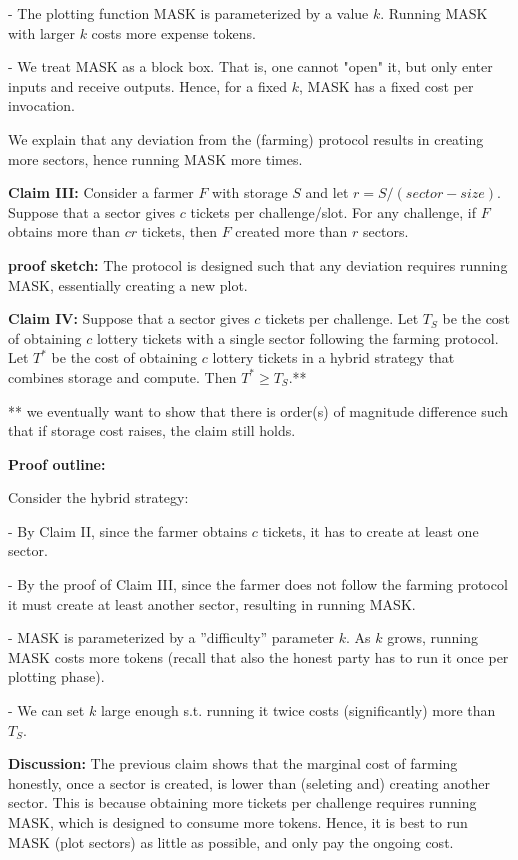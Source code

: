 \documentclass[12pt, onecolumn]{IEEEtran}
\begin{document}
- The plotting function MASK is parameterized by a value $k$. Running MASK with larger $k$ costs more expense tokens.

- We treat MASK as a block box. That is, one cannot "open" it, but only enter inputs and receive outputs. Hence, for a fixed $k$, MASK has a fixed cost per invocation.



We explain that any deviation from the (farming) protocol results in creating more sectors, hence running MASK more times.

{\bf Claim III:} Consider a farmer $F$ with storage $S$ and let $r = S/(sector-size)$. Suppose that a sector gives $c$ tickets per challenge/slot. For any challenge, if $F$ obtains more than $cr$ tickets, then $F$ created more than $r$ sectors.

{\bf proof sketch:} The protocol is designed such that any deviation requires running MASK, essentially creating a new plot.


{\bf Claim IV:} Suppose that a sector gives $c$ tickets per challenge. Let $T_S$ be the cost of obtaining $c$ lottery tickets with a single sector following the farming protocol. Let $T^*$ be the cost of obtaining $c$ lottery tickets in a hybrid strategy that combines storage and compute. Then $T^* \geq T_S$.**

** we eventually want to show that there is order(s) of magnitude difference such that if storage cost raises, the claim still holds.


{\bf Proof outline:}

Consider the hybrid strategy:

- By Claim II, since the farmer obtains $c$ tickets, it has to create at least one sector.

- By the proof of Claim III, since the farmer does not follow the farming protocol it must create at least another sector, resulting in running MASK.

- MASK is parameterized by a ''difficulty'' parameter $k$. As $k$ grows, running MASK costs more tokens (recall that also the honest party has to run it once per plotting phase).

- We can set $k$ large enough s.t. running it twice costs (significantly) more than $T_S$.

\textbf{Discussion:} The previous claim shows that the marginal cost of farming honestly, once a sector is created, is lower than (seleting and) creating another sector. This is because obtaining more tickets per challenge requires running MASK, which is designed to consume more tokens. Hence, it is best to run MASK (plot sectors) as little as possible, and only pay the ongoing cost. 
\end{document}
